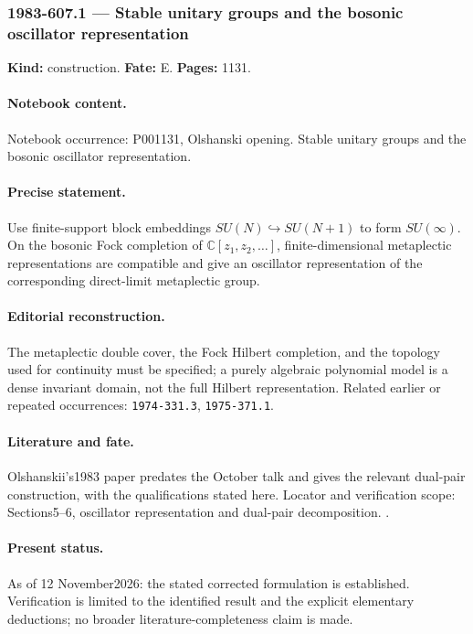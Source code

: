 \subsubsection{1983-607.1 --- Stable unitary groups and the bosonic oscillator representation}

\label{item:1983-607.1}

\noindent\textbf{Kind:} construction. \textbf{Fate:} E. \textbf{Pages:} 1131.\par

\paragraph{Notebook content.} Notebook occurrence: P001131, Olshanski opening. Stable unitary groups and the bosonic oscillator representation.

\paragraph{Precise statement.} Use finite-support block embeddings \(SU(N)\hookrightarrow SU(N+1)\) to form \(SU(\infty)\). On the bosonic Fock completion of \(\mathbb C[z_1,z_2,\ldots]\), finite-dimensional metaplectic representations are compatible and give an oscillator representation of the corresponding direct-limit metaplectic group.

\paragraph{Editorial reconstruction.} The metaplectic double cover, the Fock Hilbert completion, and the topology used for continuity must be specified; a purely algebraic polynomial model is a dense invariant domain, not the full Hilbert representation. Related earlier or repeated occurrences: \texttt{1974-331.3}, \texttt{1975-371.1}.

\paragraph{Literature and fate.} Olshanskii's1983 paper predates the October talk and gives the relevant dual-pair construction, with the qualifications stated here. Locator and verification scope: Sections5--6, oscillator representation and dual-pair decomposition. \cite{olshanskii1983pairs}.

\paragraph{Present status.} As of 12 November2026: the stated corrected formulation is established. Verification is limited to the identified result and the explicit elementary deductions; no broader literature-completeness claim is made.

